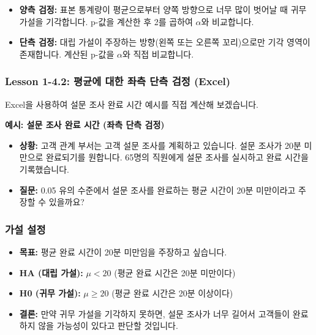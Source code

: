 \documentclass[11pt,a4paper]{article}
\theoremstyle{definition}
\begin{document}
\begin{itemize}
    \item \textbf{양측 검정:} 표본 통계량이 평균으로부터 양쪽 방향으로 너무 많이 벗어날 때 귀무 가설을 기각합니다. p-값을 계산한 후 2를 곱하여 $\alpha$와 비교합니다.
    \item \textbf{단측 검정:} 대립 가설이 주장하는 방향(왼쪽 또는 오른쪽 꼬리)으로만 기각 영역이 존재합니다. 계산된 p-값을 $\alpha$와 직접 비교합니다.
\end{itemize}

\newpage
\subsubsection{Lesson 1-4.2: 평균에 대한 좌측 단측 검정 (Excel)}

Excel을 사용하여 설문 조사 완료 시간 예시를 직접 계산해 보겠습니다.

\begin{examplebox}
\textbf{예시: 설문 조사 완료 시간 (좌측 단측 검정)}
\begin{itemize}
    \item \textbf{상황:} 고객 관계 부서는 고객 설문 조사를 계획하고 있습니다. 설문 조사가 20분 미만으로 완료되기를 원합니다. 65명의 직원에게 설문 조사를 실시하고 완료 시간을 기록했습니다.
    \item \textbf{질문:} 0.05 유의 수준에서 설문 조사를 완료하는 평균 시간이 20분 미만이라고 주장할 수 있을까요?
\end{itemize}
\end{examplebox}

\subsubsection*{가설 설정}

\begin{itemize}
    \item \textbf{목표:} 평균 완료 시간이 20분 미만임을 주장하고 싶습니다.
    \item \textbf{HA (대립 가설):} $\mu < 20$ (평균 완료 시간은 20분 미만이다)
    \item \textbf{H0 (귀무 가설):} $\mu \ge 20$ (평균 완료 시간은 20분 이상이다)
    \item \textbf{결론:} 만약 귀무 가설을 기각하지 못하면, 설문 조사가 너무 길어서 고객들이 완료하지 않을 가능성이 있다고 판단할 것입니다.
\end{itemize}
\end{document}
